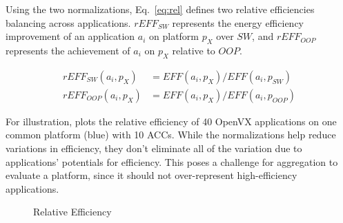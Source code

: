 Using the two normalizations, Eq.~\eqref{eq:rel} defines two relative efficiencies balancing across applications. $rEFF_{SW}$ represents the energy efficiency improvement of an application $a_i$ on platform $p_X$ over $SW$, and $rEFF_{OOP}$ represents the achievement of $a_i$ on $p_X$ relative to $OOP$.

\vspace{-8pt}
\begin{equation}
\begin{split}
	rEFF_{SW}(a_{i}, p_{X}) &= EFF(a_{i}, p_{X}) / EFF(a_{i}, p_{SW}) \\
	rEFF_{OOP}(a_{i}, p_{X}) &= EFF(a_{i}, p_{X}) / EFF(a_{i}, p_{OOP})
\label{eq:rel}
\end{split}
\end{equation}

For illustration,  plots the relative efficiency of 40 OpenVX applications on one common platform (blue) with 10 ACCs. While the normalizations help reduce variations in efficiency, they don't eliminate all of the variation due to applications' potentials for efficiency. This poses a challenge for aggregation to evaluate a platform, since it should not over-represent high-efficiency applications.

\vspace{-4pt}
\begin{figure}[h]
	\centering
		\hfill
    \vspace{-8pt}
	\caption{Relative Efficiency}
	\label{fig:eff}
\end{figure}